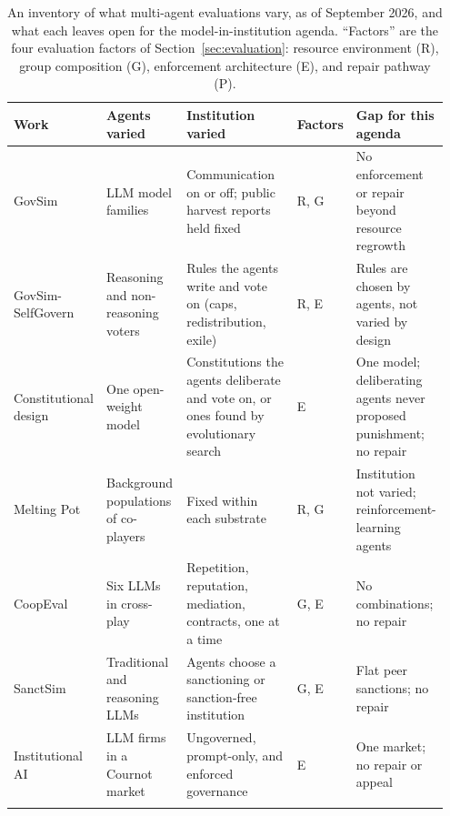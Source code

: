 \documentclass[runningheads]{llncs}
\newcommand{\rowline}{\arrayrulecolor{black!22}\specialrule{0.4pt}{2pt}{2pt}\arrayrulecolor{black}}
\begin{document}
\begin{table}[!htbp]
\centering
\caption{An inventory of what multi-agent evaluations vary, as of September 2026, and what each leaves open for the model-in-institution agenda. ``Factors'' are the four evaluation factors of Section~\mbox{\ref{sec:evaluation}}: resource environment (R), group composition (G), enforcement architecture (E), and repair pathway (P).}
\label{tab:existing-evals}
\scriptsize
\renewcommand{\arraystretch}{1.08}
\setlength{\tabcolsep}{3.5pt}
\begin{tabular}{@{}>{\raggedright\arraybackslash}p{0.17\linewidth} >{\raggedright\arraybackslash}p{0.19\linewidth} >{\raggedright\arraybackslash}p{0.30\linewidth} >{\raggedright\arraybackslash}p{0.085\linewidth} >{\raggedright\arraybackslash}p{0.205\linewidth}@{}}
\toprule
\textbf{Work} & \textbf{Agents varied} & \textbf{Institution varied} & \textbf{Factors} & \textbf{Gap for this agenda} \\
\midrule
GovSim~\citep{piatti2024govsim} & LLM model families & Communication on or off; public harvest reports held fixed & R, G & No enforcement or repair beyond resource regrowth \\ \rowline
GovSim-SelfGovern~\citep{rehm2026selfgovernance} & Reasoning and non-reasoning voters & Rules the agents write and vote on (caps, redistribution, exile) & R, E & Rules are chosen by agents, not varied by design \\ \rowline
Constitutional design~\citep{niranjani2026constitutional} & One open-weight model & Constitutions the agents deliberate and vote on, or ones found by evolutionary search & E & One model; deliberating agents never proposed punishment; no repair \\ \rowline
Melting Pot~\citep{leibo2021meltingpot} & Background populations of co-players & Fixed within each substrate & R, G & Institution not varied; reinforcement-learning agents \\ \rowline
CoopEval~\citep{tewolde2026coopevalbenchmarkingcooperationsustainingmechanisms} & Six LLMs in cross-play & Repetition, reputation, mediation, contracts, one at a time & G, E & No combinations; no repair \\ \rowline
SanctSim~\citep{piedrahita2025corruptedreasoningreasoninglanguage} & Traditional and reasoning LLMs & Agents choose a sanctioning or sanction-free institution & G, E & Flat peer sanctions; no repair \\ \rowline
Institutional AI~\citep{bracalesyrnikov2026institutionalai} & LLM firms in a Cournot market & Ungoverned, prompt-only, and enforced governance & E & One market; no repair or appeal \\ \rowline

\end{tabular}
\end{table}
\end{document}
